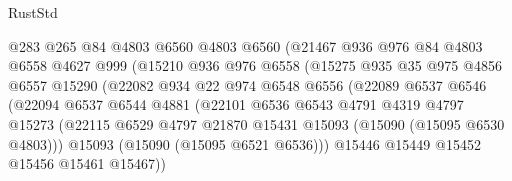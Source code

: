 \begin{lexlean}{RustStd}
\begin{coremodule}
                            @283
                            @265
                            @84
                            @4803
                            @6560
                            @4803
                            @6560
                            (@21467
                              @936
                              @976
                              @84
                              @4803
                              @6558
                              @4627
                              @999
                              (@15210
                                @936
                                @976
                                @6558
                                (@15275
                                  @935
                                  @35
                                  @975
                                  @4856
                                  @6557
                                  @15290
                                  (@22082
                                    @934
                                    @22
                                    @974
                                    @6548
                                    @6556
                                    (@22089
                                      @6537
                                      @6546
                                      (@22094
                                        @6537
                                        @6544
                                        @4881
                                        (@22101
                                          @6536
                                          @6543
                                          @4791
                                          @4319
                                          @4797
                                          @15273
                                          (@22115
                                            @6529
                                            @4797
                                            @21870
                                            @15431
                                            @15093
                                            (@15090 (@15095 @6530 @4803)))
                                          @15093
                                          (@15090 (@15095 @6521 @6536)))
                                        @15446
                                        @15449
                                        @15452
                                        @15456
                                        @15461
                                        @15467))

\end{coremodule}
\end{lexlean}
